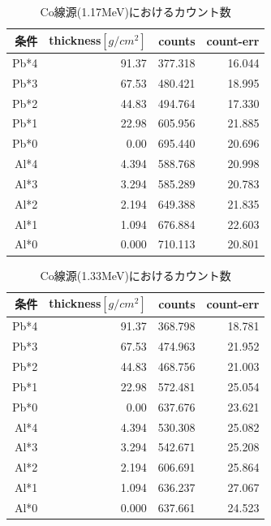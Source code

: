 \documentclass[a4paper,12pt]{jarticle}
\begin{document}
  \begin{table}[htbp]
   \begin{center}

       \caption{Co線源(1.17MeV)におけるカウント数}
        \begin{tabular}{|r|r|r|r|}
         \hline
         条件 & thickness$[g/cm^2]$ & counts & count-err \\
         \hline
         \hline
         Pb*4 & 91.37  & 377.318  & 16.044  \\
         Pb*3 & 67.53  & 480.421  & 18.995  \\
         Pb*2 & 44.83  & 494.764  & 17.330  \\
         Pb*1 & 22.98  & 605.956  & 21.885  \\
         Pb*0 & 0.00  & 695.440  & 20.696  \\
        \hline
        Al*4 & 4.394  & 588.768  & 20.998  \\
        Al*3 & 3.294  & 585.289  & 20.783  \\
        Al*2 & 2.194  & 649.388  & 21.835  \\
        Al*1 & 1.094  & 676.884  & 22.603  \\
        Al*0 & 0.000  & 710.113  & 20.801  \\
         \hline
        \end{tabular}
       \label{table:Co60_left}

   \end{center}
  \end{table}


  \begin{table}[htbp]
   \begin{center}

       \caption{Co線源(1.33MeV)におけるカウント数}
        \begin{tabular}{|r|r|r|r|}
         \hline
         条件 & thickness$[g/cm^2]$ & counts & count-err \\
         \hline
         \hline
         Pb*4 & 91.37  & 368.798  & 18.781  \\
         Pb*3 & 67.53  & 474.963  & 21.952  \\
         Pb*2 & 44.83  & 468.756  & 21.003  \\
         Pb*1 & 22.98  & 572.481  & 25.054  \\
         Pb*0 & 0.00  & 637.676  & 23.621  \\
         \hline
         Al*4 & 4.394  & 530.308  & 25.082  \\
         Al*3 & 3.294  & 542.671  & 25.208  \\
         Al*2 & 2.194  & 606.691  & 25.864  \\
         Al*1 & 1.094  & 636.237  & 27.067  \\
         Al*0 & 0.000  & 637.661  & 24.523  \\

         \hline
        \end{tabular}
       \label{table:Co60_right}

   \end{center}
  \end{table}
\end{document}
